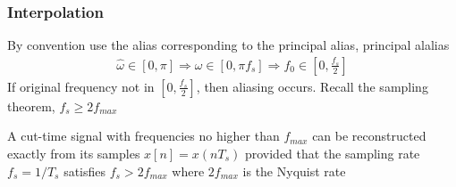 \documentclass{article}
\begin{document}
                \subsubsection{Interpolation}
                By convention use the alias corresponding to the principal alias, principal alalias
                \begin{align}
                    \hat{\omega}\in[0,\pi]\Rightarrow \omega\in[0,\pi f_s] \Rightarrow f_0\in[0,\frac{f_s}{2}]
                \end{align}
                If original frequency not in $[0,\frac{f_s}{2}]$, then aliasing occurs. 
                Recall the sampling theorem, $f_s \geq 2f_{max}$

                A cut-time signal with frequencies no higher than $f_{max}$ can be reconstructed exactly from
                its samples $x[n] = x(nT_s)$ provided that the sampling rate $f_s = 1/T_s$ satisfies $f_s > 2f_{max}$
                where $2f_{max}$ is the Nyquist rate
\end{document}
